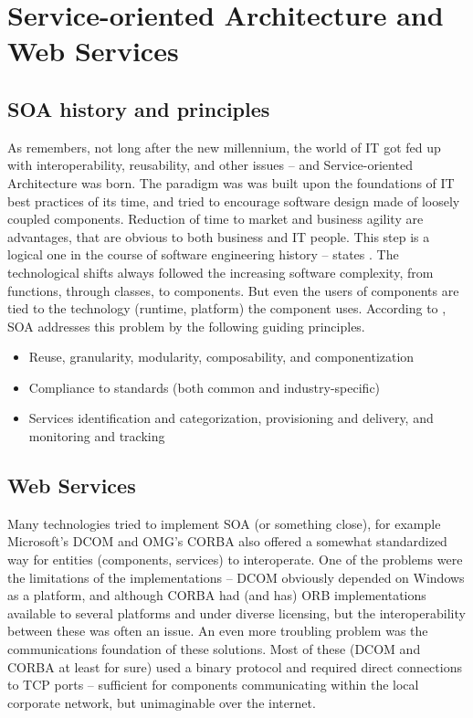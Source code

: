 \chapter{Service-oriented Architecture and Web Services}

\section{SOA history and principles}

As \cite{soa_modeling} remembers, not long after the new millennium, the world of IT got fed up with interoperability, reusability, and other issues -- and Service-oriented Architecture was born. The paradigm was was built upon the foundations of IT best practices of its time, and tried to encourage software design made of loosely coupled components. Reduction of time to market and business agility are advantages, that are obvious to both business and IT people. This step is a logical one in the course of software engineering history -- states \cite{devcom_soa_intro}. The technological shifts always followed the increasing software complexity, from functions, through classes, to components. But even the users of components are tied to the technology (runtime, platform) the component uses. According to \cite{ibm_soa_impro}, SOA addresses this problem by the following guiding principles.

\begin{itemize}
 \item Reuse, granularity, modularity, composability, and componentization
 \item Compliance to standards (both common and industry-specific)
 \item Services identification and categorization, provisioning and delivery, and monitoring and tracking
\end{itemize}

\section{Web Services}

Many technologies tried to implement SOA (or something close), for example Microsoft's DCOM and OMG's CORBA also offered a somewhat standardized way for entities (components, services) to interoperate. One of the problems were the limitations of the implementations -- DCOM obviously depended on Windows as a platform, and although CORBA had (and has) ORB implementations available to several platforms and under diverse licensing, but the interoperability between these was often an issue. An even more troubling problem was the communications foundation of these solutions. Most of these (DCOM and CORBA at least for sure) used a binary protocol and required direct connections to TCP ports -- sufficient for components communicating within the local corporate network, but unimaginable over the internet.

